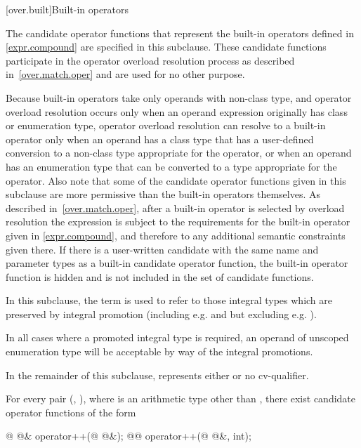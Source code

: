 [over.built]{Built-in operators}%

\pnum
The candidate operator functions that represent the built-in operators
defined in \ref{expr.compound} are specified in this subclause.
These candidate
functions participate in the operator overload resolution process as
described in~\ref{over.match.oper} and are used for no other purpose.
\begin{note}
Because built-in operators take only operands with non-class type,
and operator overload resolution occurs only when an operand expression
originally has class or enumeration type,
operator overload resolution can resolve to a built-in operator only
when an operand has a class type that has a user-defined conversion to
a non-class type appropriate for the operator, or when an operand has
an enumeration type that can be converted to a type appropriate
for the operator.
Also note that some of the candidate operator functions given in this subclause are
more permissive than the built-in operators themselves.
As
described in~\ref{over.match.oper}, after a built-in operator is selected
by overload resolution the expression is subject to the requirements for
the built-in operator given in \ref{expr.compound}, and therefore to any
additional semantic constraints given there.
If there is a user-written
candidate with the same name and parameter types as a built-in
candidate operator function, the built-in operator function
is hidden and is not included in the set of candidate functions.
\end{note}

\pnum
{}%
%
In this subclause, the term
is used to refer to those integral types which are preserved by
integral promotion (including e.g.
and
but excluding e.g.
).
\begin{note}
In all cases where a promoted integral type is
required, an operand of unscoped enumeration type will be acceptable by way of the
integral promotions.
\end{note}

\pnum
In the remainder of this subclause,  represents either
 or no cv-qualifier.

\pnum
For every pair
(,
),
where
is an arithmetic type other than ,
there exist candidate operator functions of the form
\begin{codeblock}
@ @& operator++(@ @&);
@@ operator++(@ @&, int);
\end{codeblock}

